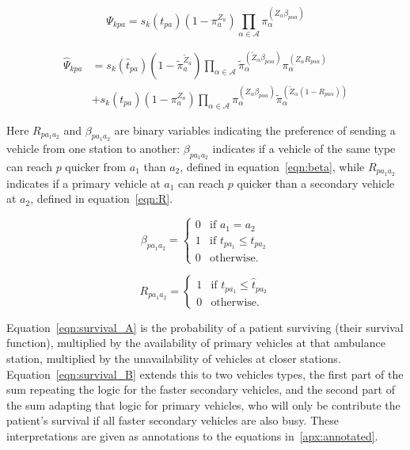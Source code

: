 \documentclass[preprint,12pt]{elsarticle}
\begin{document}
\begin{equation}\label{eqn:survival_A}
\Psi_{kpa} = s_k\left( t_{pa} \right)
\left(1 - \pi_{a}^{Z_a} \right)
\prod_{\alpha \in \mathcal{A}}
\pi_{\alpha}^{\left(Z_{\alpha} \beta_{p\alpha a} \right)}
\end{equation}

\begin{align}\label{eqn:survival_B}
\hat{\Psi}_{kpa} &= s_k\left(\hat{t}_{pa}\right)
\left(1 - \tilde{\pi}_{a}^{\tilde{Z}_a} \right)
\prod_{\alpha \in \mathcal{A}}
\tilde{\pi}_{\alpha}^{\left(\tilde{Z}_{\alpha} \beta_{p\alpha a}\right)}
\pi_{\alpha}^{\left(Z_{\alpha} R_{p \alpha a}\right) } \nonumber \\
&+ s_k\left(t_{pa}\right) \left(1 - \pi_{a}^{Z_a} \right)
\prod_{\alpha \in \mathcal{A}}
\pi_{\alpha}^{\left(Z_{\alpha}\beta_{p\alpha a}\right)}
\tilde{\pi}_{\alpha}^{\left(\tilde{Z}_{\alpha}
\left(1 - R _{p a\alpha}\right)\right)}
\end{align}

Here $R_{p a_1 a_2}$ and $\beta_{p a_1 a_2}$ are binary variables indicating
the preference of sending a vehicle from one station to another:
$\beta_{p a_1 a_2}$ indicates if a vehicle of the same type can reach $p$
quicker from $a_1$ than $a_2$, defined in equation~\ref{eqn:beta}, while
$R_{p a_1 a_2}$ indicates if a primary vehicle at $a_1$ can reach $p$ quicker
than a secondary vehicle at $a_2$, defined in equation~\ref{eqn:R}.

\begin{equation}\label{eqn:beta}
\beta_{p a_1 a_2} = \begin{cases}
    0 & \text{if } a_1 = a_2\\
    1 & \text{if } t_{p a_1} \leq t_{p a_2}\\
    0 & \text{otherwise.}
\end{cases}
\end{equation}

\begin{equation}\label{eqn:R}
R_{p a_1 a_2} = \begin{cases}
    1 & \text{if } t_{p a_1} \leq \hat{t}_{p a_2}\\
    0 & \text{otherwise.}
\end{cases}
\end{equation}

Equation~\ref{eqn:survival_A} is the probability of a patient surviving (their
survival function), multiplied by the availability of primary vehicles at that
ambulance station, multiplied by the unavailability of vehicles at closer
stations.
Equation~\ref{eqn:survival_B} extends this to two vehicles types, the first
part of the sum repeating the logic for the faster secondary vehicles, and the
second part of the sum adapting that logic for primary vehicles, who will only
be contribute the patient's survival if all faster secondary vehicles are also
busy. These interpretations are given as annotations to the equations
in~\ref{apx:annotated}.
\end{document}
